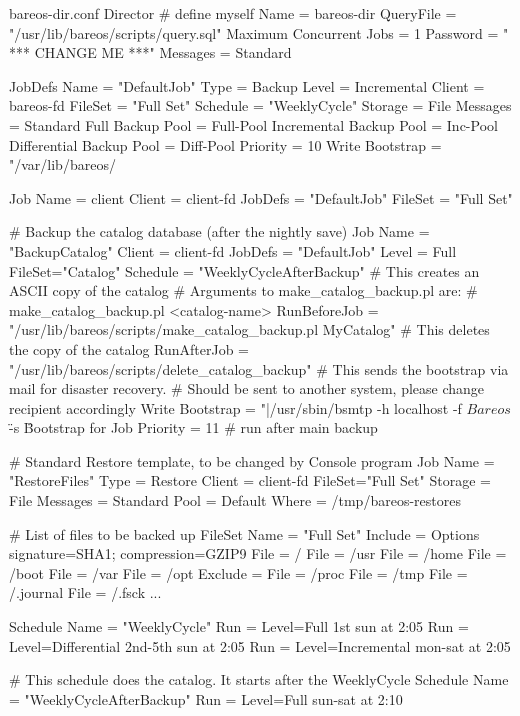 \begin{bconfig}{bareos-dir.conf}
Director {          # define myself
  Name = bareos-dir
  QueryFile = "/usr/lib/bareos/scripts/query.sql"
  Maximum Concurrent Jobs = 1
  Password = " *** CHANGE ME ***"
  Messages = Standard
}

JobDefs {
  Name = "DefaultJob"
  Type = Backup
  Level = Incremental
  Client = bareos-fd
  FileSet = "Full Set"
  Schedule = "WeeklyCycle"
  Storage = File
  Messages = Standard
  Full Backup Pool = Full-Pool
  Incremental Backup Pool = Inc-Pool
  Differential Backup Pool = Diff-Pool
  Priority = 10
  Write Bootstrap = "/var/lib/bareos/%
}

Job {
  Name = client
  Client = client-fd
  JobDefs = "DefaultJob"
  FileSet = "Full Set"
}

# Backup the catalog database (after the nightly save)
Job {
  Name = "BackupCatalog"
  Client = client-fd
  JobDefs = "DefaultJob"
  Level = Full
  FileSet="Catalog"
  Schedule = "WeeklyCycleAfterBackup"
  # This creates an ASCII copy of the catalog
  # Arguments to make_catalog_backup.pl are:
  #  make_catalog_backup.pl <catalog-name>
  RunBeforeJob = "/usr/lib/bareos/scripts/make_catalog_backup.pl MyCatalog"
  # This deletes the copy of the catalog
  RunAfterJob  = "/usr/lib/bareos/scripts/delete_catalog_backup"
  # This sends the bootstrap via mail for disaster recovery.
  # Should be sent to another system, please change recipient accordingly
  Write Bootstrap = "|/usr/sbin/bsmtp -h localhost -f \"\(Bareos\) \" -s \"Bootstrap for Job %
  Priority = 11                   # run after main backup
}

# Standard Restore template, to be changed by Console program
Job {
  Name = "RestoreFiles"
  Type = Restore
  Client = client-fd
  FileSet="Full Set"
  Storage = File
  Messages = Standard
  Pool = Default
  Where = /tmp/bareos-restores
}

# List of files to be backed up
FileSet {
  Name = "Full Set"
  Include = { Options { signature=SHA1; compression=GZIP9 }
    File = /
    File = /usr
    File = /home
    File = /boot
    File = /var
    File = /opt
  }
  Exclude = {
    File = /proc
    File = /tmp
    File = /.journal
    File = /.fsck
    ...
  }
}

Schedule {
  Name = "WeeklyCycle"
  Run = Level=Full 1st sun at 2:05
  Run = Level=Differential 2nd-5th sun at 2:05
  Run = Level=Incremental mon-sat at 2:05
}

# This schedule does the catalog. It starts after the WeeklyCycle
Schedule {
  Name = "WeeklyCycleAfterBackup"
  Run = Level=Full sun-sat at 2:10
}


\end{bconfig}
